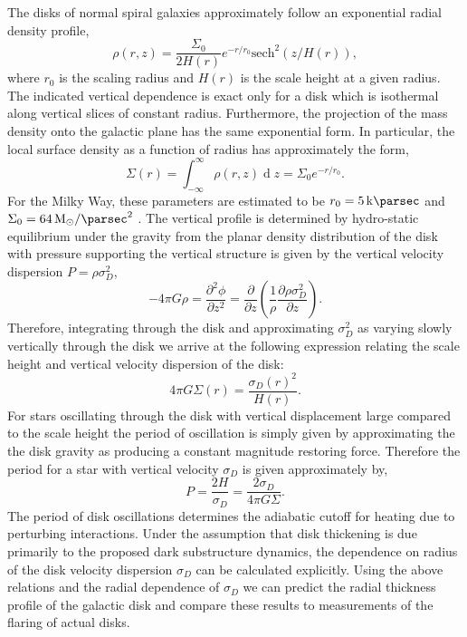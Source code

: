 \documentclass[usenatbib]{mnras}
\renewcommand{\d}[1]{\! \mathrm{d}#1 \:}
\newcommand{\pderiv}[2]{\frac{\partial{#1}}{\partial{#2}}}
\renewcommand{\d}[1]{\ensuremath{\operatorname{d}\!{#1}}}
\begin{document}
\par
The disks of normal spiral galaxies approximately follow an exponential radial density profile,
\begin{equation}
\rho(r, z) = \frac{\Sigma_0}{2 H(r)} e^{-r/r_0} \mathrm{sech}^2{(z/H(r))}, 
\end{equation}
where $r_0$ is the scaling radius and $H(r)$ is the scale height at a given radius. The indicated vertical dependence is exact only for a disk which is isothermal along vertical slices of constant radius. Furthermore, the projection of the mass density onto the galactic plane has the same exponential form. In particular, the local surface density as a function of radius has approximately the form,
\begin{equation}
\Sigma(r) = \int_{-\infty}^{\infty} \rho(r, z) \d{z} = \Sigma_0 e^{-r / r_0}.
\end{equation}
For the Milky Way, these parameters are estimated to be $r_0 = \SI{5}{\kilo \parsec}$ and $\Sigma_0 = \SI{64}{M_{\odot} \per \parsec \squared}$ \citep{dynamical_measurement}. The vertical profile is determined by hydro-static equilibrium under the gravity from the planar density distribution of the disk with pressure supporting the vertical structure is given by the vertical velocity dispersion $P = \rho \sigma_D^2$,
\begin{equation}
- 4 \pi G \rho = \frac{\partial^2 \phi}{\partial z^2} = \pderiv{}{z} \left( \frac{1}{\rho} \pderiv{ \rho \sigma_D^2}{z} \right).
\end{equation}  
Therefore, integrating through the disk and approximating $\sigma_D^2$ as varying slowly vertically through the disk we arrive at the following expression relating the scale height and vertical velocity dispersion of the disk:
\begin{equation} \label{scale}
4 \pi G \Sigma(r) = \frac{ \sigma_D(r)^2 }{H(r)}.
\end{equation}
For stars oscillating through the disk with vertical displacement large compared to the scale height the period of oscillation is simply given by approximating the the disk gravity as producing a constant magnitude restoring force. Therefore the period for a star with vertical velocity $\sigma_D$ is given approximately by,
\begin{equation}
P = \frac{2 H}{\sigma_D} = \frac{2 \sigma_D}{4 \pi G \Sigma}.
\end{equation}
The period of disk oscillations determines the adiabatic cutoff for heating due to perturbing interactions. Under the assumption that disk thickening is due primarily to the proposed dark substructure dynamics, the dependence on radius of the disk velocity dispersion $\sigma_D$ can be calculated explicitly. Using the above relations and the radial dependence of $\sigma_D$ we can predict the radial thickness profile of the galactic disk and compare these results to measurements of the flaring of actual disks.  
\end{document}
